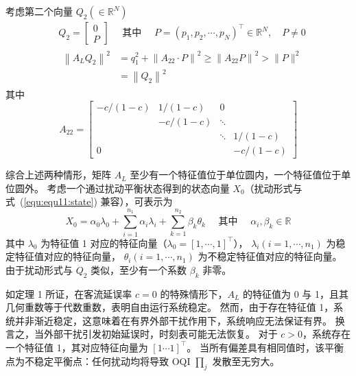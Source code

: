 考虑第二个向量 $Q_{2}\left(\in \mathbb{R}^{N}\right)$
\begin{equation*}
    \begin{aligned}
        &Q_{2}=\left[\begin{array}{l}
            0 \\
            P
        \end{array}\right] \quad \text { 其中 } \quad P=\left(p_{1}, p_{2}, \cdots, p_{N}\right)^{\top} \in \mathbb{R}^{N}, \quad P \neq 0 \\
        &\begin{aligned}
            \left\|A_{L} Q_{2}\right\|^{2} &=q_{1}^{2}+\left\|A_{22} \cdot P\right\|^{2} \geq\left\|A_{22} P\right\|^{2}>\|P\|^{2} \\
            &=\left\|Q_{2}\right\|^{2}
        \end{aligned}
    \end{aligned}
\end{equation*}
其中
\begin{equation*}
    A_{22}=\left[\begin{array}{cccc}
        -c /(1-c) & 1 /(1-c) & 0 & \\
        & -c /(1-c) & \ddots & \\
        & & \ddots & 1 /(1-c) \\
        0 & & & -c /(1-c)
    \end{array}\right]
\end{equation*}

综合上述两种情形，矩阵 $A_L$ 至少有一个特征值位于单位圆内，一个特征值位于单位圆外。
考虑一个通过扰动平衡状态得到的状态向量 $X_0$（扰动形式与式~(\ref{equ:equ11:state}) 兼容），可表示为
\begin{equation}
    X_{0}=\alpha_{0} \lambda_0+\sum_{i=1}^{n_{1}} \alpha_{i} \lambda_i+\sum_{k=1}^{n_{2}} \beta_{k} \theta_k \quad \text { 其中 } \quad \alpha_{i}, \beta_{k} \in \mathbb{R}
\end{equation}
其中 $\lambda_0$ 为特征值 1 对应的特征向量（$\lambda_{0}=[1,\cdots,1]^{\top}$），
$\lambda_i\left(i=1,\cdots,n_1\right)$ 为稳定特征值对应的特征向量，
$\theta_i\left(i=1,\cdots,n_1\right)$ 为不稳定特征值对应的特征向量。
由于扰动形式与 $Q_2$ 类似，至少有一个系数 $\beta_{k}$ 非零。

如定理 1 所证，在客流延误率 $c=0$ 的特殊情形下，$A_L$ 的特征值为 0 与 1，且其几何重数等于代数重数，表明自由运行系统稳定。
然而，由于存在特征值 1，系统并非渐近稳定，这意味着在有界外部干扰作用下，系统响应无法保证有界。
换言之，当外部干扰引发初始延误时，时刻表可能无法恢复。
对于 $c>0$，系统存在一个特征值 1，其对应特征向量为 $[1 \cdots 1]^{\top}$。
当所有偏差具有相同值时，该平衡点为不稳定平衡点：任何扰动均将导致 OQI $\prod_j$ 发散至无穷大。

